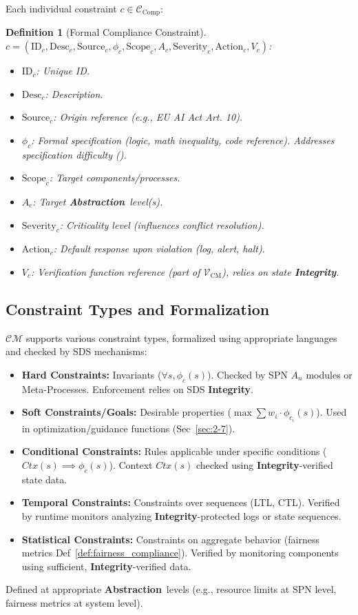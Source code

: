 \documentclass[12pt,a4paper]{report}
\renewcommand{\citep}[1]{\textit{\scriptsize{(\cite{#1})}}}
\newtheorem{definition}{Definition}[section]
\newcommand{\Integrity}{\textbf{Integrity}}
\newcommand{\Abstraction}{\textbf{Abstraction}}
\begin{document}
	Each individual constraint $c \in \mathcal{C}_{\text{Comp}}$:
	\begin{definition}[Formal Compliance Constraint]
		\label{def:compliance_constraint}
		$c = (\text{ID}_c, \text{Desc}_c, \text{Source}_c, \phi_c, \text{Scope}_c, A_c, \text{Severity}_c, \text{Action}_c, V_c)$:
		\begin{itemize}[noitemsep]
			\item $\text{ID}_c$: Unique ID.
			\item $\text{Desc}_c$: Description.
			\item $\text{Source}_c$: Origin reference (e.g., EU AI Act Art. 10).
			\item $\phi_c$: Formal specification (logic, math inequality, code reference). Addresses specification difficulty \citep{Kovac2025SpecGaming}.
			\item $\text{Scope}_c$: Target components/processes.
			\item $A_c$: Target \Abstraction\ level(s).
			\item $\text{Severity}_c$: Criticality level (influences conflict resolution).
			\item $\text{Action}_c$: Default response upon violation (log, alert, halt).
			\item $V_c$: Verification function reference (part of $\mathcal{V}_{\text{CM}}$), relies on state \Integrity.
		\end{itemize}
	\end{definition}
	
	\subsection{Constraint Types and Formalization} %
	\label{sec:5-2-2} %
	
	$\mathcal{CM}$ supports various constraint types, formalized using appropriate languages and checked by SDS mechanisms:
	\begin{itemize}[noitemsep]
		\item \textbf{Hard Constraints:} Invariants ($\forall s, \phi_c(s)$). Checked by SPN $A_n$ modules or Meta-Processes. Enforcement relies on SDS \Integrity.
		\item \textbf{Soft Constraints/Goals:} Desirable properties ($\max \sum w_i \cdot \phi_{c_i}(s)$). Used in optimization/guidance functions (Sec~\ref{sec:2-7}).
		\item \textbf{Conditional Constraints:} Rules applicable under specific conditions ($Ctx(s) \implies \phi_c(s)$). Context $Ctx(s)$ checked using \Integrity-verified state data.
		\item \textbf{Temporal Constraints:} Constraints over sequences (LTL, CTL). Verified by runtime monitors analyzing \Integrity-protected logs or state sequences.
		\item \textbf{Statistical Constraints:} Constraints on aggregate behavior (fairness metrics Def~\ref{def:fairness_compliance}). Verified by monitoring components using sufficient, \Integrity-verified data.
	\end{itemize}
	Defined at appropriate \Abstraction\ levels (e.g., resource limits at SPN level, fairness metrics at system level).
	
\end{document}
